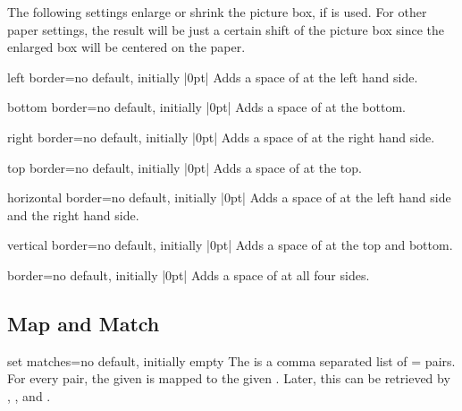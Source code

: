 \documentclass[a4paper,11pt]{ltxdoc}
\begin{document}
The following settings enlarge or shrink the picture box, if
 is used. For other paper settings, the result
will be just a certain shift of the picture box since the enlarged box
will be centered on the paper.

\begin{docIgrKey}[][doc new=2015-03-12]{left border}{=}{no default, initially |0pt|}
Adds a space of  at the left hand side.
\end{docIgrKey}

\begin{docIgrKey}[][doc new=2015-03-12]{bottom border}{=}{no default, initially |0pt|}
Adds a space of  at the bottom.
\end{docIgrKey}

\begin{docIgrKey}[][doc new=2015-03-12]{right border}{=}{no default, initially |0pt|}
Adds a space of  at the right hand side.
\end{docIgrKey}

\begin{docIgrKey}[][doc new=2015-03-12]{top border}{=}{no default, initially |0pt|}
Adds a space of  at the top.
\end{docIgrKey}

\begin{docIgrKey}[][doc new=2015-03-12]{horizontal border}{=}{no default, initially |0pt|}
Adds a space of  at the left hand side and the right hand side.
\end{docIgrKey}

\begin{docIgrKey}[][doc new=2015-03-12]{vertical border}{=}{no default, initially |0pt|}
Adds a space of  at the top and bottom.
\end{docIgrKey}

\begin{docIgrKey}[][doc new=2015-03-12]{border}{=}{no default, initially |0pt|}
Adds a space of  at all four sides.
\end{docIgrKey}


\clearpage
\subsection{Map and Match}

\begin{docIgrKey}{set matches}{=}{no default, initially empty}
  The  is a comma separated list of = pairs.
  For every pair, the given  is mapped to the given .
  Later, this  can be retrieved by
  ,
  , and
  .

\begin{dispListing}
\end{dispListing}
\end{docIgrKey}
\tcbusetemp
\end{document}
